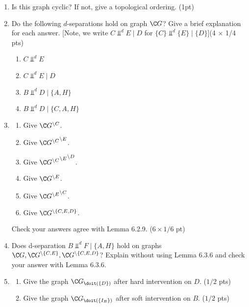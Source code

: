 \begin{enumerate}
  \item Is this graph cyclic? If not, give a topological ordering. (1pt)
  \item Do the following $d$-separations hold on graph $\C G$? Give a brief explanation for each answer. [Note, we write $C \Perp^d E \mid D$ for $\{C\} \Perp^d \{E\} \mid \{D\}$](4 $\times$ 1/4 pts)
  \begin{enumerate}
    \item $\displaystyle  C \Perp^d E$
    \item $\displaystyle C \Perp^d E \mid D$
    \item $\displaystyle B \Perp^d D \mid \{A, H\}$
    \item $\displaystyle B \Perp^d D \mid \{C, A, H\}$
  \end{enumerate}
  \item
  \begin{enumerate}
  \item Give $\C G^{\setminus C}$.
  \item Give ${\C G^{\setminus C}}^{\setminus E}$.
  \item Give ${{\C G^{\setminus C}}^{\setminus E}}^{\setminus D}$.
  \item Give $\C G^{\setminus E}$.
  \item Give ${\C G^{\setminus E}}^{\setminus C}$.
  \item Give $\C G^{\setminus \{C,E,D\}}$.
  \end{enumerate}
  Check your answers agree with Lemma 6.2.9. ($6 \times 1/6$ pt)
  \item Does d-separation $\displaystyle B \Perp^d F \mid \{A, H\}$ hold on graphs $\C G, \C G^{\setminus \{C,E\}},\C G^{\setminus \{C,E,D\}}$? Explain without using Lemma 6.3.6 and check your answer with Lemma 6.3.6.
  \item
  \begin{enumerate}
    \item Give the graph $\C G_{\doit(\{D\})}$ after hard intervention on $D$. ($1/2$ pts)
    \item Give the graph $\C G_{\doit(\{I_B\})}$ after soft intervention on $B$. ($1/2$ pts)
  \end{enumerate}
\end{enumerate}
